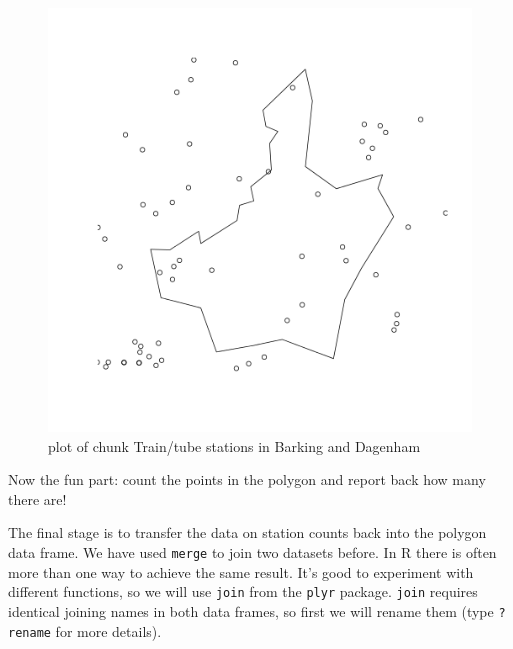 \documentclass[]{article}
\makeatletter
\newenvironment{Shaded}{}{}
\newcommand{\KeywordTok}[1]{\textcolor[rgb]{0.00,0.44,0.13}{\textbf{{#1}}}}
\newcommand{\StringTok}[1]{\textcolor[rgb]{0.25,0.44,0.63}{{#1}}}
\newcommand{\NormalTok}[1]{{#1}}
\def\maxwidth{\ifdim\Gin@nat@width>\linewidth\linewidth
\else\Gin@nat@width\fi}
\let\Oldincludegraphics\includegraphics
\renewcommand{\includegraphics}[1]{\Oldincludegraphics[width=\maxwidth]{#1}}
\makeatother
\begin{document}
\begin{Shaded}
\end{Shaded}
\begin{figure}[htbp]
\centering
\includegraphics{figure/Train/tube_stations_in_Barking_and_Dagenham.png}
\caption{plot of chunk Train/tube stations in Barking and Dagenham}
\end{figure}

Now the fun part: count the points in the polygon and report back how
many there are!

The final stage is to transfer the data on station counts back into the
polygon data frame. We have used \texttt{merge} to join two datasets
before. In R there is often more than one way to achieve the same
result. It's good to experiment with different functions, so we will use
\texttt{join} from the \texttt{plyr} package. \texttt{join} requires
identical joining names in both data frames, so first we will rename
them (type \texttt{?rename} for more details).
\end{document}
